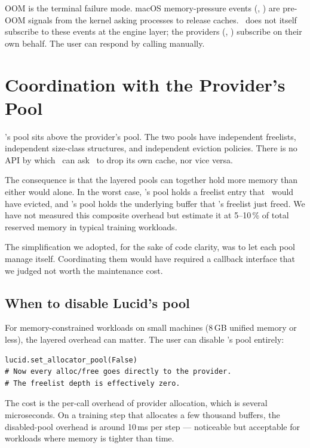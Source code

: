OOM is the terminal failure mode. macOS memory-pressure events
(,
) are pre-OOM signals from
the kernel asking processes to release caches. \Lucid\ does not
itself subscribe to these events at the engine layer; the providers
(\MLX, \Accelerate) subscribe on their own behalf. The user can
respond by calling  manually.

\section{Coordination with the Provider's Pool}
\label{sec:allocator:coordination}

\Lucid's pool sits above the provider's pool. The two pools have
independent freelists, independent size-class structures, and
independent eviction policies. There is no API by which \Lucid\
can ask \MLX\ to drop its own cache, nor vice versa.

The consequence is that the layered pools can together hold more
memory than either would alone. In the worst case, \Lucid's pool
holds a freelist entry that \MLX\ would have evicted, and
\MLX's pool holds the underlying buffer that \Lucid's freelist
just freed. We have not measured this composite overhead but
estimate it at 5--10\,\% of total reserved memory in typical
training workloads.

The simplification we adopted, for the sake of code clarity, was to
let each pool manage itself. Coordinating them would have required
a callback interface that we judged not worth the maintenance cost.

\subsection{When to disable Lucid's pool}
\label{ssec:allocator:disable_pool}

For memory-constrained workloads on small machines (8\,GB unified
memory or less), the layered overhead can matter. The user can
disable \Lucid's pool entirely:

\begin{lstlisting}[style=lucid,language=LucidPython]
lucid.set_allocator_pool(False)
# Now every alloc/free goes directly to the provider.
# The freelist depth is effectively zero.
\end{lstlisting}

The cost is the per-call overhead of provider allocation, which is
several microseconds. On a training step that allocates a few
thousand buffers, the disabled-pool overhead is around 10\,ms per
step --- noticeable but acceptable for workloads where memory is
tighter than time.

